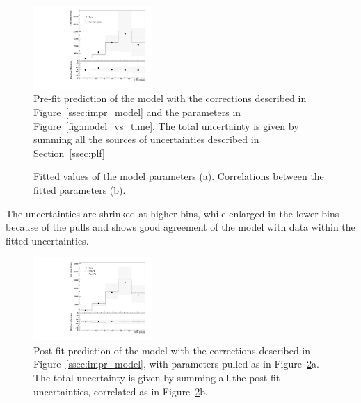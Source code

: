 \begin{figure}
\centering
\includegraphics[width=0.4\textwidth]{imgs/Covid/ModelPrefit.pdf} 
  \caption{Pre-fit prediction of the model with the corrections described in Figure~\ref{ssec:impr_model} and the parameters in Figure~\ref{fig:model_vs_time}. The total uncertainty is given by summing all the sources of uncertainties described in Section~\ref{ssec:plf}}
  \label{fig:prefit}
\end{figure}

\begin{figure}
\centering
{}
  \caption{Fitted values of the model parameters (a). Correlations between the fitted parameters (b).}
  \label{fig:nps}
\end{figure}

The uncertainties are shrinked at higher bins, while enlarged in the lower bins because of the pulls and shows good agreement of the model with data within the fitted uncertainties.

\begin{figure}
\centering
\includegraphics[width=0.4\textwidth]{imgs/Covid/ModelPostFit.pdf} 
  \caption{Post-fit prediction of the model with the corrections described in Figure~\ref{ssec:impr_model}, with parameters pulled as in Figure~\ref{fig:nps}a. The total uncertainty is given by summing all the post-fit uncertainties, correlated as in Figure~\ref{fig:nps}b.}
  \label{fig:postfit}
\end{figure}